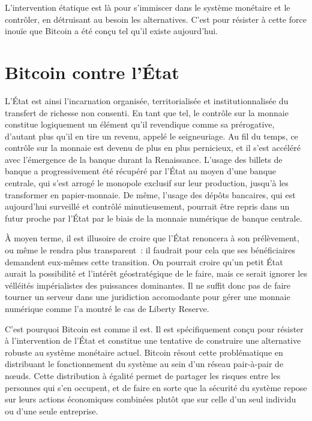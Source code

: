 L'intervention étatique est là pour s'immiscer dans le système monétaire et le contrôler, en détruisant au besoin les alternatives. C'est pour résister à cette force inouïe que Bitcoin a été conçu tel qu'il existe aujourd'hui.

\section*{Bitcoin contre l'État} %

L'État est ainsi l'incarnation organisée, territorialisée et institutionnalisée du transfert de richesse non consenti. En tant que tel, le contrôle sur la monnaie constitue logiquement un élément qu'il revendique comme sa prérogative, d'autant plus qu'il en tire un revenu, appelé le seigneuriage. Au fil du temps, ce contrôle sur la monnaie est devenu de plus en plus pernicieux, et il s'est accéléré avec l'émergence de la banque durant la Renaissance. L'usage des billets de banque a progressivement été récupéré par l'État au moyen d'une banque centrale, qui s'est arrogé le monopole exclusif sur leur production, jusqu'à les transformer en papier-monnaie. De même, l'usage des dépôts bancaires, qui est aujourd'hui surveillé et contrôlé minutieusement, pourrait être repris dans un futur proche par l'État par le biais de la monnaie numérique de banque centrale.

À moyen terme, il est illusoire de croire que l'État renoncera à son prélèvement, ou même le rendra plus transparent~: il faudrait pour cela que ses bénéficiaires demandent eux-mêmes cette transition. On pourrait croire qu'un petit État aurait la possibilité et l'intérêt géostratégique de le faire, mais ce serait ignorer les vélléités impérialistes des puissances dominantes. Il ne suffit donc pas de faire tourner un serveur dans une juridiction accomodante pour gérer une monnaie numérique comme l'a montré le cas de Liberty Reserve.

C'est pourquoi Bitcoin est comme il est. Il est spécifiquement conçu pour résister à l'intervention de l'État et constitue une tentative de construire une alternative robuste au système monétaire actuel. Bitcoin résout cette problématique en distribuant le fonctionnement du système au sein d'un réseau pair-à-pair de nœuds. Cette distribution à égalité permet de partager les risques entre les personnes qui s'en occupent, et de faire en sorte que la sécurité du système repose sur leurs actions économiques combinées plutôt que sur celle d'un seul individu ou d'une seule entreprise. %
